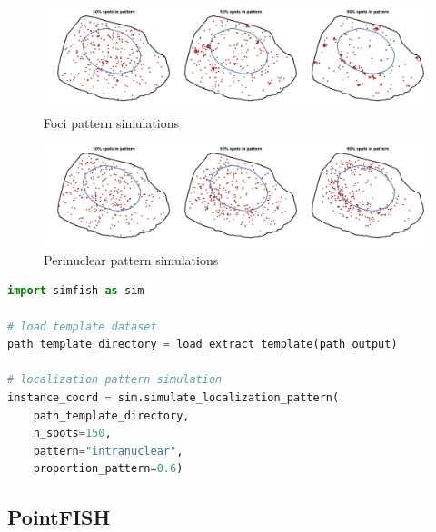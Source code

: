 \begin{figure}[h]
    \centering
    \includegraphics[width=1\textwidth]{figures/chapter4/foci_panel}
    \caption{Foci pattern simulations}
    \label{fig:foci_panel}
\end{figure}

\begin{figure}[h]
    \centering
    \includegraphics[width=1\textwidth]{figures/chapter4/perinuclear_panel}
    \caption{Perinuclear pattern simulations}
    \label{fig:perinuclear_panel}
\end{figure}

\begin{minipage}{0.9\textwidth}
\begin{lstlisting}[language=Python]
import simfish as sim

# load template dataset
path_template_directory = load_extract_template(path_output)

# localization pattern simulation
instance_coord = sim.simulate_localization_pattern(
	path_template_directory,
	n_spots=150,
	pattern="intranuclear",
	proportion_pattern=0.6)
\end{lstlisting}
\end{minipage}

\subsection{PointFISH} \label{subsec:pointfish}


